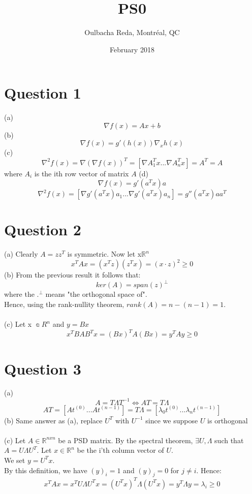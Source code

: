 \documentclass{article}
\title{PS0}
\author{Oulbacha Reda, Montréal, QC}
\date{February 2018}
\begin{document}
\maketitle

\section*{Question 1}
(a) $$\nabla f(x) = Ax + b$$ \n
(b) $$\nabla f(x) = g'(h(x)) \nabla_x h(x)$$ \n  
(c) $$\nabla^2 f(x) = \nabla(\nabla f(x))^T = [\nabla A_1^Tx ... \nabla A_n^Tx ]  = A^T = A $$ where $A_i$ is the ith row vector of matrix $A$ \newline
(d) $$\nabla f(x) = g'(a^Tx)a$$ \n
$$ \nabla^2 f(x) = [ \nabla g'(a^Tx)a_1 ... \nabla g'(a^Tx)a_n ] = g''(a^Tx)aa^T $$

\section*{Question 2}
(a) Clearly $A = zz^T$ is symmetric. Now let x\in$\mathbb R^n$ \n
$$x^TAx = (x^Tz)(z^Tx) = (x \cdot z)^2 \ge  0$$ \n
(b) From the previous result it follows that:
$$ker(A) = span(z)^\bot$$ where the $.^\bot$ means "the orthogonal space of". \n
\\ Hence, using the rank-nullity theorem, $rank(A) = n - (n-1) = 1 $.
\\
\\
(c) Let x \in $\Bbba R^n$ \n and $y=Bx$ 
$$x^TBAB^Tx = (Bx)^TA(Bx) = y^TAy\ge0$$
\section*{Question 3}
(a) $$A=T\Lambda T^{-1} \Leftrightarrow AT = T\Lambda$$
$$ AT = [At^{(0)}...At^{(n-1)}] = T\Lambda = [\lambda_0t^{(0)}...\lambda_nt^{(n-1)}] $$
(b) Same answer as (a), replace $U^T$ with $U^{-1}$ since we suppose $U$ is orthogonal \\ 
\\
(c) Let $A\in\mathbb R^{nxn}$ be a PSD matrix. By the spectral theorem, $\exists U,\Lambda$ such that $A = U\Lambda U^T$. Let $x\in\mathbb{R}^n$ be the i'th column vector of $U$.\\
We set $y=U^Tx$.\\
By this definition, we have $(y)_i = 1$ and $(y)_j = 0$ for $j\neq i$. Hence:
$$x^TAx = x^TU\Lambda U^Tx = (U^Tx)^T\Lambda(U^Tx) = y^T\Lambda y = \lambda_i \ge0$$
\end{document}
